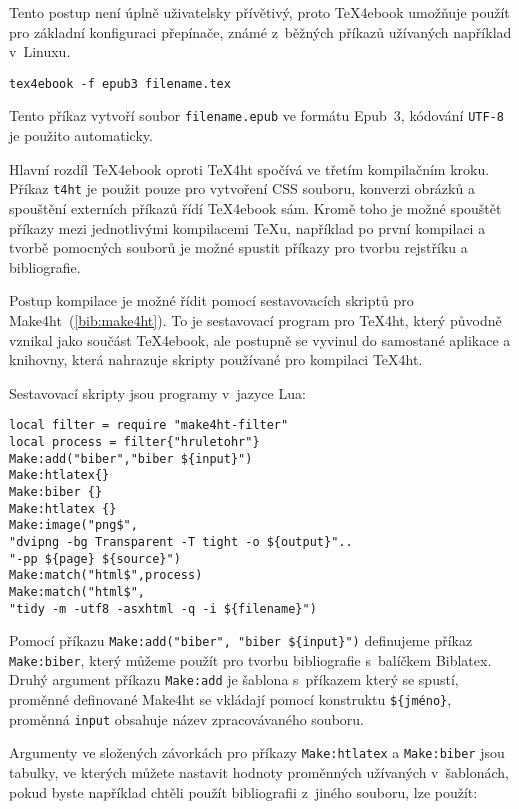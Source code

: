\documentclass{csbulletin}
\renewcommand\cite[1]{(\ref{#1})}
\begin{document}
Tento postup není úplně uživatelsky přívětivý, proto TeX4ebook umožňuje
použít pro základní konfiguraci přepínače, známé z~běžných příkazů užívaných
například v~Linuxu.

\begin{verbatim}
tex4ebook -f epub3 filename.tex
\end{verbatim}

Tento příkaz vytvoří soubor \texttt{filename.epub} ve formátu Epub~3, kódování
\texttt{UTF-8} je použito automaticky. 

Hlavní rozdíl TeX4ebook oproti TeX4ht spočívá ve třetím kompilačním kroku.
Příkaz \texttt{t4ht} je použit pouze pro vytvoření CSS souboru, konverzi
obrázků a spouštění externích příkazů řídí TeX4ebook sám. Kromě toho je možné
spouštět příkazy mezi jednotlivými kompilacemi \TeX u, například po první
kompilaci a tvorbě pomocných souborů je možné spustit příkazy pro tvorbu
rejstříku a bibliografie. 

Postup kompilace je možné řídit pomocí sestavovacích skriptů pro
Make4ht~\cite{bib:make4ht}. To je sestavovací program
pro TeX4ht, který původně vznikal jako součást TeX4ebook, ale postupně se
vyvinul do samostané aplikace a knihovny, která nahrazuje skripty používané pro
kompilaci TeX4ht.

Sestavovací skripty jsou programy v~jazyce Lua:

\begin{verbatim}
local filter = require "make4ht-filter"
local process = filter{"hruletohr"}
Make:add("biber","biber ${input}")
Make:htlatex{}
Make:biber {}
Make:htlatex {}
Make:image("png$",                                                          
"dvipng -bg Transparent -T tight -o ${output}"..
"-pp ${page} ${source}")
Make:match("html$",process)
Make:match("html$",
"tidy -m -utf8 -asxhtml -q -i ${filename}")
\end{verbatim}


Pomocí příkazu \verb|Make:add("biber", "biber ${input}")| definujeme příkaz
\verb|Make:biber|, který můžeme použít  pro tvorbu bibliografie s~balíčkem
Biblatex. Druhý argument příkazu \verb|Make:add| je šablona s~příkazem který se
spustí, proměnné definované Make4ht se vkládají pomocí konstruktu
\verb|${jméno}|, proměnná \texttt{input} obsahuje název zpracovávaného souboru.

Argumenty ve složených závorkách pro příkazy \texttt{Make:htlatex} a
\texttt{Make:biber} jsou tabulky, ve kterých můžete nastavit hodnoty
proměnných užívaných v~šablonách, pokud byste například chtěli použít
bibliografii z~jiného souboru, lze použít:
\end{document}
